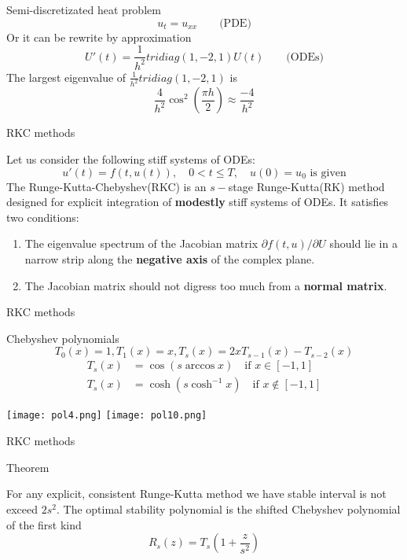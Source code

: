\documentclass{beamer}
\begin{document}
\begin{frame}
	\begin{block}{Semi-discretizated heat problem}
	$$u_t=u_{xx} \quad \quad \text{(PDE)}$$
	Or it can be rewrite by approximation  $$U'(t)=\frac{1}{h^2}tridiag(1,-2,1)U(t) \quad \quad \text{(ODEs)}$$	
The largest eigenvalue of $\frac{1}{h^2}tridiag(1,-2,1)$ is $$\dfrac{4}{h^2} \cos^2 \left(\dfrac{\pi h }{2}\right) \approx \dfrac{-4}{h^2}$$
	\end{block}	
\end{frame}
\begin{frame}{RKC methods}
	\begin{block}{}
	Let us consider the following stiff systems of ODEs: $$u'(t)=f(t,u(t)), \quad 0 <t \le T, \quad u(0)=u_0 \text{ is given}$$ The Runge-Kutta-Chebyshev(RKC) is an $s-$stage Runge-Kutta(RK) method designed for explicit integration of \textbf{modestly} stiff systems of ODEs. It satisfies two conditions:
	\begin{enumerate}
		\item The eigenvalue spectrum of the Jacobian matrix $\partial f(t,u)/ \partial U$ should lie in a narrow strip along the \textbf{negative axis} of the complex plane.
		\item 	The Jacobian matrix should not digress too much from a\textbf{ normal matrix}.
	\end{enumerate}
	\end{block}	
\end{frame}
\begin{frame}{RKC methods}
	\begin{block}{Chebyshev polynomials}
		 $$T_0(x)=1 , T_1(x)=x , T_s(x)=2xT_{s-1}(x)-T_{s-2}(x)$$
		 $$\begin{aligned}T_s(x)&=\cos(s \arccos x) \quad \text{if } x \in [-1,1] \\
		 T_s(x)&=\cosh(s \cosh^{-1} x) \quad \text{if } x \notin [-1,1] \end{aligned}$$
	\end{block}
\texttt{[image: pol4.png]}
\texttt{[image: pol10.png]}	
	\end{frame}

\begin{frame}{RKC methods}
	\begin{beamerboxesrounded}{Theorem}		
	
For any explicit, consistent Runge-Kutta method we have stable interval is not exceed $2s^2$. The optimal stability polynomial is the shifted Chebyshev polynomial of the first kind
$$R_s(z)=T_s\left(1+\frac{z}{s^2}\right) $$
\end{beamerboxesrounded}
\end{frame}
\end{document}
